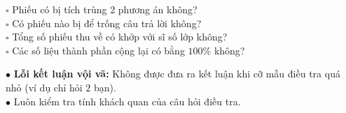 \documentclass[14pt,a4paper,oneside]{extbook}
\begin{document}
\noindent
\begin{minipage}[t]{0.54\textwidth}
  \begin{tcolorbox}[
    enhanced,
    title={\footnotesize\bfseries\color{white}\faCheckCircle\ Checklist chất lượng số liệu},
    colback=green!3!white,
    colframe=green!60!black,
    arc=2.5mm, boxrule=0.8pt, top=1.8mm, bottom=1.8mm, left=2.2mm, right=2.2mm
  ]
    \footnotesize
    $\square$ Phiếu có bị tích trùng $2$ phương án không?\\
    $\square$ Có phiếu nào bị để trống câu trả lời không?\\
    $\square$ Tổng số phiếu thu về có khớp với sĩ số lớp không?\\
    $\square$ Các số liệu thành phần cộng lại có bằng $100\%$ không?
  \end{tcolorbox}
\end{minipage}%
\hfill
\begin{minipage}[t]{0.44\textwidth}
  \begin{tcolorbox}[
    enhanced,
    title={\footnotesize\bfseries\color{white}\faExclamationTriangle\ Mẹo tránh bẫy trắc nghiệm},
    colback=red!2!white,
    colframe=red!70!black,
    arc=2.5mm, boxrule=0.8pt, top=1.8mm, bottom=1.8mm, left=2.2mm, right=2.2mm
  ]
    \footnotesize
    $\bullet$ \textbf{Lỗi kết luận vội vã:} Không được đưa ra kết luận khi cỡ mẫu điều tra quá nhỏ (ví dụ chỉ hỏi $2$ bạn).\\
    $\bullet$ Luôn kiểm tra tính khách quan của câu hỏi điều tra.
  \end{tcolorbox}
\end{minipage}
\end{document}
